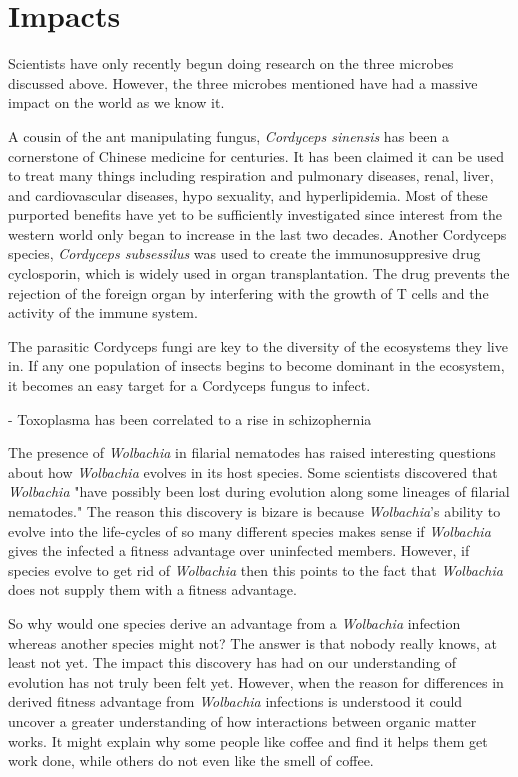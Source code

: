 \documentclass[twocolumn]{article}
\begin{document}
\section*{Impacts}

Scientists have only recently begun doing research on the three microbes discussed above. However, the three microbes mentioned have had a massive impact on the world as we know it. 


A cousin of the ant manipulating fungus, \textit{Cordyceps sinensis} has been a cornerstone of Chinese medicine for centuries. It has been claimed it can be used to treat many things including respiration and pulmonary diseases, renal, liver, and cardiovascular diseases, hypo sexuality, and hyperlipidemia. Most of these purported benefits have yet to be sufficiently investigated since interest from the western world only began to increase in the last two decades. \cite{medicinal_cordy} Another Cordyceps species, \textit{Cordyceps subsessilus} was used to create the immunosuppresive drug cyclosporin, which is widely used in organ transplantation. The drug prevents the rejection of the foreign organ by interfering with the growth of T cells and the activity of the immune system.\cite{cordy_tcells}

The parasitic Cordyceps fungi are key to the diversity of the ecosystems they live in. If any one population of insects begins to become dominant in the ecosystem, it becomes an easy target for a Cordyceps fungus to infect.  \cite{cordy_video}

- Toxoplasma has been correlated to a rise in schizophernia

The presence of \textit{Wolbachia} in filarial nematodes has raised interesting questions about how \textit{Wolbachia} evolves in its host species. Some scientists discovered that \textit{Wolbachia} "have possibly been lost during evolution along some lineages of filarial nematodes."\cite{Wevolution_loss} The reason this discovery is bizare is because \textit{Wolbachia}'s ability to evolve into the life-cycles of so many different species makes sense if \textit{Wolbachia} gives the infected a fitness advantage over uninfected members. However, if species evolve to get rid of \textit{Wolbachia} then this points to the fact that \textit{Wolbachia} does not supply them with a fitness advantage.

So why would one species derive an advantage from a \textit{Wolbachia} infection whereas another species might not? The answer is that nobody really knows, at least not yet. The impact this discovery has had on our understanding of evolution has not truly been felt yet. However, when the reason for differences in derived fitness advantage from \textit{Wolbachia} infections is understood it could uncover a greater understanding of how interactions between organic matter works. It might explain why some people like coffee and find it helps them get work done, while others do not even like the smell of coffee.
\end{document}
